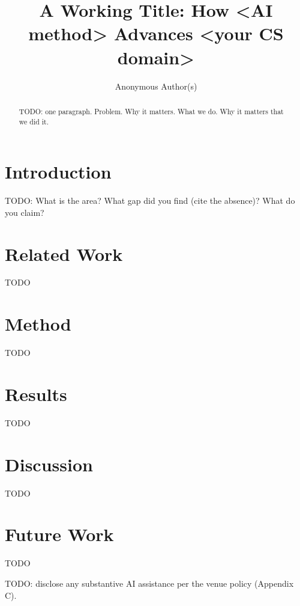 \documentclass[manuscript,review,anonymous]{acmart}
\begin{document}
\title{A Working Title: How <AI method> Advances <your CS domain>}

\author{Anonymous Author(s)}   %

\begin{abstract}
TODO: one paragraph. Problem. Why it matters. What we do. Why it matters that we did it.
\end{abstract}

\maketitle

\section{Introduction}
TODO: What is the area? What gap did you find (cite the absence)? What do you claim?

\section{Related Work}
TODO

\section{Method}
TODO

\section{Results}
TODO

\section{Discussion}
TODO

\section{Future Work}
TODO

\begin{acks}
TODO: disclose any substantive AI assistance per the venue policy (Appendix C).
\end{acks}


\end{document}
